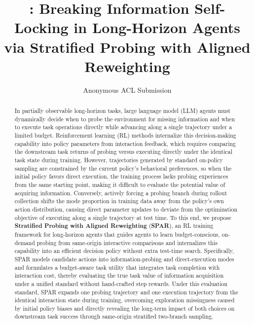 \documentclass[11pt]{article}
\title{\spar{}: Breaking Information Self-Locking in Long-Horizon Agents via Stratified Probing with Aligned Reweighting}
\author{Anonymous ACL Submission}
\theoremstyle{definition}
\theoremstyle{remark}
\newcommand{\spar}{\textsc{SPAR}}
\begin{document}
\maketitle

\begin{abstract}
In partially observable long-horizon tasks, large language model (LLM) agents must dynamically decide when to probe the environment for missing information and when to execute task operations directly while advancing along a single trajectory under a limited budget.
Reinforcement learning (RL) methods internalize this decision-making capability into policy parameters from interaction feedback, which requires comparing the downstream task returns of probing versus executing directly under the identical task state during training.
However, trajectories generated by standard on-policy sampling are constrained by the current policy's behavioral preferences, so when the initial policy favors direct execution, the training process lacks probing experiences from the same starting point, making it difficult to evaluate the potential value of acquiring information.
Conversely, actively forcing a probing branch during rollout collection shifts the mode proportion in training data away from the policy's own action distribution, causing direct parameter updates to deviate from the optimization objective of executing along a single trajectory at test time.
To this end, we propose \textbf{Stratified Probing with Aligned Reweighting} (\textbf{\spar{}}), an RL training framework for long-horizon agents that guides agents to learn budget-conscious, on-demand probing from same-origin interactive comparisons and internalizes this capability into an efficient decision policy without extra test-time search.
Specifically, \spar{} models candidate actions into information-probing and direct-execution modes and formulates a budget-aware task utility that integrates task completion with interaction cost, thereby evaluating the true task value of information acquisition under a unified standard without hand-crafted step rewards.
Under this evaluation standard, \spar{} expands one probing trajectory and one execution trajectory from the identical interaction state during training, overcoming exploration missingness caused by initial policy biases and directly revealing the long-term impact of both choices on downstream task success through same-origin stratified two-branch sampling.

\end{abstract}
\end{document}
